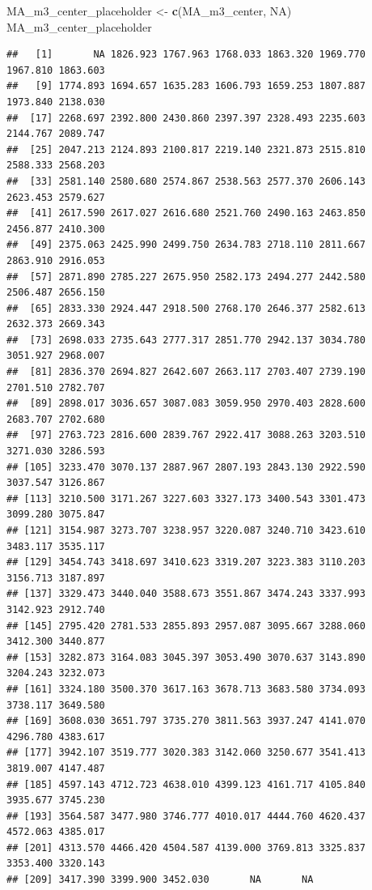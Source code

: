 \documentclass[
]{article}
\newenvironment{Shaded}{\begin{snugshade}}{\end{snugshade}}
\newcommand{\ConstantTok}[1]{\textcolor[rgb]{0.56,0.35,0.01}{#1}}
\newcommand{\FunctionTok}[1]{\textcolor[rgb]{0.13,0.29,0.53}{\textbf{#1}}}
\newcommand{\NormalTok}[1]{#1}
\newcommand{\OtherTok}[1]{\textcolor[rgb]{0.56,0.35,0.01}{#1}}
\begin{document}
\begin{Shaded}
\begin{Highlighting}[]
\NormalTok{MA\_m3\_center\_placeholder }\OtherTok{\textless{}{-}} \FunctionTok{c}\NormalTok{(MA\_m3\_center, }\ConstantTok{NA}\NormalTok{)}
\NormalTok{MA\_m3\_center\_placeholder}
\end{Highlighting}
\end{Shaded}

\begin{verbatim}
##   [1]       NA 1826.923 1767.963 1768.033 1863.320 1969.770 1967.810 1863.603
##   [9] 1774.893 1694.657 1635.283 1606.793 1659.253 1807.887 1973.840 2138.030
##  [17] 2268.697 2392.800 2430.860 2397.397 2328.493 2235.603 2144.767 2089.747
##  [25] 2047.213 2124.893 2100.817 2219.140 2321.873 2515.810 2588.333 2568.203
##  [33] 2581.140 2580.680 2574.867 2538.563 2577.370 2606.143 2623.453 2579.627
##  [41] 2617.590 2617.027 2616.680 2521.760 2490.163 2463.850 2456.877 2410.300
##  [49] 2375.063 2425.990 2499.750 2634.783 2718.110 2811.667 2863.910 2916.053
##  [57] 2871.890 2785.227 2675.950 2582.173 2494.277 2442.580 2506.487 2656.150
##  [65] 2833.330 2924.447 2918.500 2768.170 2646.377 2582.613 2632.373 2669.343
##  [73] 2698.033 2735.643 2777.317 2851.770 2942.137 3034.780 3051.927 2968.007
##  [81] 2836.370 2694.827 2642.607 2663.117 2703.407 2739.190 2701.510 2782.707
##  [89] 2898.017 3036.657 3087.083 3059.950 2970.403 2828.600 2683.707 2702.680
##  [97] 2763.723 2816.600 2839.767 2922.417 3088.263 3203.510 3271.030 3286.593
## [105] 3233.470 3070.137 2887.967 2807.193 2843.130 2922.590 3037.547 3126.867
## [113] 3210.500 3171.267 3227.603 3327.173 3400.543 3301.473 3099.280 3075.847
## [121] 3154.987 3273.707 3238.957 3220.087 3240.710 3423.610 3483.117 3535.117
## [129] 3454.743 3418.697 3410.623 3319.207 3223.383 3110.203 3156.713 3187.897
## [137] 3329.473 3440.040 3588.673 3551.867 3474.243 3337.993 3142.923 2912.740
## [145] 2795.420 2781.533 2855.893 2957.087 3095.667 3288.060 3412.300 3440.877
## [153] 3282.873 3164.083 3045.397 3053.490 3070.637 3143.890 3204.243 3232.073
## [161] 3324.180 3500.370 3617.163 3678.713 3683.580 3734.093 3738.117 3649.580
## [169] 3608.030 3651.797 3735.270 3811.563 3937.247 4141.070 4296.780 4383.617
## [177] 3942.107 3519.777 3020.383 3142.060 3250.677 3541.413 3819.007 4147.487
## [185] 4597.143 4712.723 4638.010 4399.123 4161.717 4105.840 3935.677 3745.230
## [193] 3564.587 3477.980 3746.777 4010.017 4444.760 4620.437 4572.063 4385.017
## [201] 4313.570 4466.420 4504.587 4139.000 3769.813 3325.837 3353.400 3320.143
## [209] 3417.390 3399.900 3452.030       NA       NA
\end{verbatim}
\end{document}
